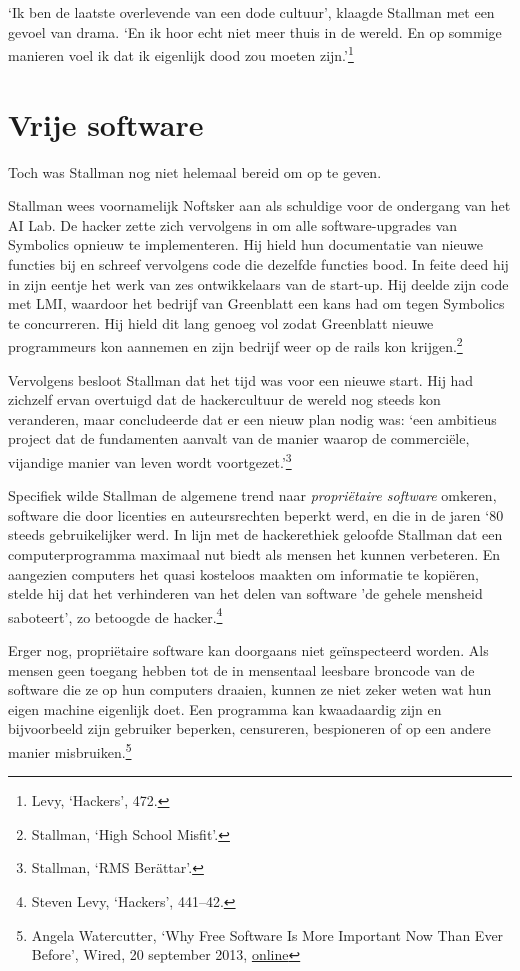 \documentclass[smalldemyvopaper,11pt,twoside,onecolumn,openright,extrafontsizes,hidelinks]{memoir}
\begin{document}
`Ik ben de laatste overlevende van een dode cultuur', klaagde Stallman
met een gevoel van drama. `En ik hoor echt niet meer thuis in de wereld.
En op sommige manieren voel ik dat ik eigenlijk dood zou moeten
zijn.'\footnote{\hspace{0pt}Levy, `Hackers', 472.}

\section{Vrije software}\label{vrije-software}

Toch was Stallman nog niet helemaal bereid om op te geven.

Stallman wees voornamelijk Noftsker aan als schuldige voor de ondergang
van het AI Lab. De hacker zette zich vervolgens in om alle
software-upgrades van Symbolics opnieuw te implementeren. Hij hield hun
documentatie van nieuwe functies bij en schreef vervolgens code die
dezelfde functies bood. In feite deed hij in zijn eentje het werk van
zes ontwikkelaars van de start-up. Hij deelde zijn code met LMI,
waardoor het bedrijf van Greenblatt een kans had om tegen Symbolics te
concurreren. Hij hield dit lang genoeg vol zodat Greenblatt nieuwe
programmeurs kon aannemen en zijn bedrijf weer op de rails kon
krijgen.\footnote{\hspace{0pt}Stallman, `High School Misfit'.}

Vervolgens besloot Stallman dat het tijd was voor een nieuwe start. Hij
had zichzelf ervan overtuigd dat de hackercultuur de wereld nog steeds
kon veranderen, maar concludeerde dat er een nieuw plan nodig was: `een
ambitieus project dat de fundamenten aanvalt van de manier waarop de
commerciële, vijandige manier van leven wordt voortgezet.'\footnote{\hspace{0pt}Stallman,
  `RMS Berättar'.}

Specifiek wilde Stallman de algemene trend naar \emph{propriëtaire
software} omkeren, software die door licenties en auteursrechten beperkt
werd, en die in de jaren `80 steeds gebruikelijker werd. In lijn met de
hackerethiek geloofde Stallman dat een computerprogramma maximaal nut
biedt als mensen het kunnen verbeteren. En aangezien computers het quasi
kosteloos maakten om informatie te kopiëren, stelde hij dat het
verhinderen van het delen van software 'de gehele mensheid saboteert',
zo betoogde de hacker.\footnote{\hspace{0pt}Steven Levy, `Hackers',
  441--42.}

Erger nog, propriëtaire software kan doorgaans niet geïnspecteerd
worden. Als mensen geen toegang hebben tot de in mensentaal leesbare
broncode van de software die ze op hun computers draaien, kunnen ze niet
zeker weten wat hun eigen machine eigenlijk doet. Een programma kan
kwaadaardig zijn en bijvoorbeeld zijn gebruiker beperken, censureren,
bespioneren of op een andere manier misbruiken.\footnote{\hspace{0pt}Angela
  Watercutter, `Why Free Software Is More Important Now Than Ever
  Before', Wired, 20 september 2013,
  \href{https://www.wired.com/2013/09/why-free-software-is-more-important-now-than-ever-before/}{online}}
\end{document}
